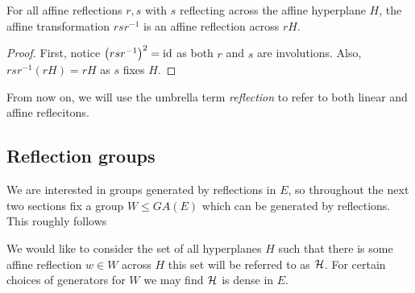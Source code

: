 \documentclass[../main.tex]{subfiles}
\begin{document}
\begin{proposition}
    For all affine reflections $r,s$ with $s$ reflecting across the affine hyperplane $H$, the affine transformation $rsr^{-1}$ is an affine reflection across $rH$.
    \begin{proof}
        First, notice $\left( rsr^{-1} \right)^2 = \text{id}$ as both $r$ and $s$ are involutions. Also, $rsr^{-1}(rH) = rH$ as $s$ fixes $H$.
    \end{proof}
\end{proposition}

From now on, we will use the umbrella term \textit{reflection} to refer to both linear and affine reflecitons.

\subsection{Reflection groups}

We are interested in groups generated by reflections in $E$, so throughout the next two sections fix a group $W\leq GA(E)$ which can be generated by reflections. This roughly follows \cite{Humphreys1990}

We would like to consider the set of all hyperplanes $H$ such that there is some affine reflection $w\in W$ across $H$ this set will be referred to as $\mathcal{H}$. For certain choices of generators for $W$ we may find $\mathcal{H}$ is dense in $E$.
\end{document}
